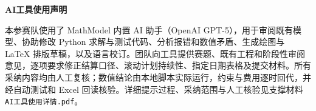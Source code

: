 {}
\begin{center}
	{\bfseries AI工具使用声明}
\end{center}

本参赛队使用了 MathModel 内置 AI 助手（OpenAI GPT-5），用于审阅既有模型、协助修改 Python 求解与测试代码、分析报错和数值矛盾、生成绘图与 LaTeX 排版草稿，以及语言校订。团队向工具提供赛题、既有工程和阶段性审阅意见，逐项要求修正结算口径、滚动计划持续性、指定日期表格及提交材料。所有采纳内容均由人工复核；数值结论由本地脚本实际运行，约束与费用逐时回代，并经自动测试和 Excel 回读核验。详细提示过程、采纳范围与人工核验见支撑材料 \texttt{AI工具使用详情.pdf}。

